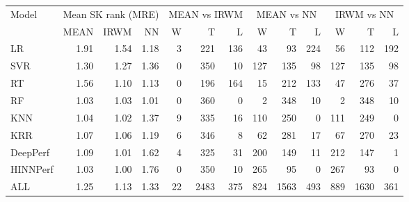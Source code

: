\begin{tabular}{lrrrrrrrrrrrr}
\toprule
Model & \multicolumn{3}{c}{Mean SK rank (MRE)} & \multicolumn{3}{c}{MEAN vs IRWM} & \multicolumn{3}{c}{MEAN vs NN} & \multicolumn{3}{c}{IRWM vs NN} \\
 & MEAN & IRWM & NN & W & T & L & W & T & L & W & T & L \\
\midrule
LR & 1.91 & 1.54 & 1.18 & 3 & 221 & 136 & 43 & 93 & 224 & 56 & 112 & 192 \\
SVR & 1.30 & 1.27 & 1.36 & 0 & 350 & 10 & 127 & 135 & 98 & 127 & 135 & 98 \\
RT & 1.56 & 1.10 & 1.13 & 0 & 196 & 164 & 15 & 212 & 133 & 47 & 276 & 37 \\
RF & 1.03 & 1.03 & 1.01 & 0 & 360 & 0 & 2 & 348 & 10 & 2 & 348 & 10 \\
KNN & 1.04 & 1.02 & 1.37 & 9 & 335 & 16 & 110 & 250 & 0 & 111 & 249 & 0 \\
KRR & 1.07 & 1.06 & 1.19 & 6 & 346 & 8 & 62 & 281 & 17 & 67 & 270 & 23 \\
DeepPerf & 1.09 & 1.01 & 1.62 & 4 & 325 & 31 & 200 & 149 & 11 & 212 & 147 & 1 \\
HINNPerf & 1.03 & 1.00 & 1.76 & 0 & 350 & 10 & 265 & 95 & 0 & 267 & 93 & 0 \\
ALL & 1.25 & 1.13 & 1.33 & 22 & 2483 & 375 & 824 & 1563 & 493 & 889 & 1630 & 361 \\
\bottomrule
\end{tabular}
